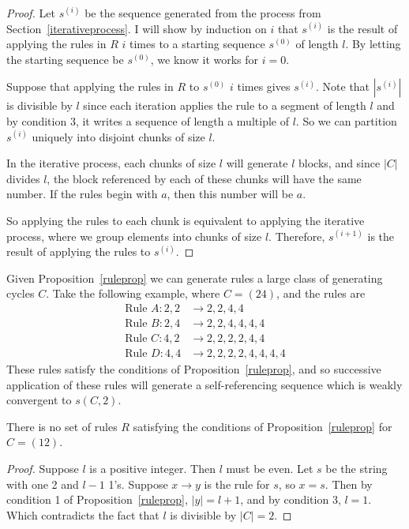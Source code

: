 \documentclass[runningheads,a4paper]{llncs}
\begin{document}
\begin{proof}
Let $s^{(i)}$ be the sequence generated from the process from Section~\ref{iterativeprocess}. I will show by induction on $i$ that $s^{(i)}$ is the result of applying the rules in $R$ $i$ times to a starting sequence $s^{(0)}$ of length $l$. By letting the starting sequence be $s^{(0)}$, we know it works for $i = 0$.

Suppose that applying the rules in $R$ to $s^{(0)}$ $i$ times gives $s^{(i)}$. Note that $|s^{(i)}|$ is divisible by $l$ since each iteration applies the rule to a segment of length $l$ and by condition 3, it writes a sequence of length a multiple of $l$. So we can partition $s^{(i)}$ uniquely into disjoint chunks of size $l$. 

In the iterative process, each chunks of size $l$ will generate $l$ blocks, and since $|C|$ divides $l$, the block referenced by each of these chunks will have the same number. If the rules begin with $a$, then this number will be $a$.  

So applying the rules to each chunk is equivalent to applying the iterative process, where we  group elements into chunks of size $l$. Therefore, $s^{(i+1)}$ is the result of applying the rules to $s^{(i)}$.
\end{proof}

Given Proposition~\ref{ruleprop} we can generate rules a large class of generating cycles $C$. Take the following example, where $C = (2 4)$, and the rules are
\begin{align*}
\text{Rule }A: 2,2 &\to 2, 2, 4, 4 \\
\text{Rule }B: 2,4 &\to 2, 2, 4,4,4,4\\
\text{Rule }C: 4,2 &\to 2,2,2,2,4,4\\
\text{Rule }D: 4,4 &\to 2, 2, 2, 2, 4, 4, 4, 4
\end{align*}
These rules satisfy the conditions of Proposition~\ref{ruleprop}, and so successive application of these rules will generate a self-referencing sequence which is weakly convergent to $s(C, 2)$. 

\begin{proposition}
\label{norules12}
There is no set of rules $R$ satisfying the conditions of Proposition~\ref{ruleprop} for $C=(12)$.
\end{proposition}

\begin{proof}
Suppose $l$ is a positive integer. Then $l$ must be even. Let $s$ be the string with one 2 and $l-1$ 1's. Suppose $x \rightarrow y$ is the rule for $s$, so $x = s$. Then by condition 1 of Proposition~\ref{ruleprop}, $|y| = l+1$, and by condition 3, $l = 1$. Which contradicts the fact that $l$ is divisible by $|C| = 2$. 
\end{proof}
\end{document}
